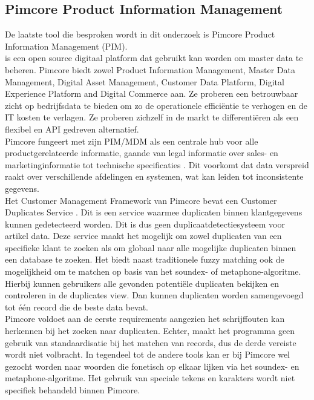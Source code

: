 \subsection{Pimcore Product Information Management}
De laatste tool die besproken wordt in dit onderzoek is Pimcore Product Information Management (PIM). 
\\ \textcite{Pimcore} is een open source digitaal platform dat gebruikt kan worden om master data te beheren. Pimcore biedt zowel Product Information Management, Master Data Management, Digital Asset Management, Customer Data Platform, Digital Experience Platform and Digital Commerce aan. Ze proberen een betrouwbaar zicht op bedrijfsdata te bieden om zo de operationele efficiëntie te verhogen en de IT kosten te verlagen. Ze proberen zichzelf in de markt te differentiëren als een flexibel en API gedreven alternatief. 
\\Pimcore fungeert met zijn PIM/MDM als een centrale hub voor alle productgerelateerde informatie, gaande van legal informatie over sales- en marketinginformatie tot technische specificaties \autocite{StudioEmma}. Dit voorkomt dat data verspreid raakt over verschillende afdelingen en systemen, wat kan leiden tot inconsistente gegevens.
\\Het Customer Management Framework van Pimcore bevat een Customer Duplicates Service \autocite{Pimcore2024}. Dit is een service waarmee duplicaten binnen klantgegevens kunnen gedetecteerd worden. Dit is dus geen duplicaatdetectiesysteem voor artikel data. Deze service maakt het mogelijk om zowel duplicaten van een specifieke klant te zoeken als om globaal naar alle mogelijke duplicaten binnen een database te zoeken. Het biedt naast traditionele fuzzy matching ook de mogelijkheid om te matchen op basis van het soundex- of metaphone-algoritme. Hierbij kunnen gebruikers alle gevonden potentiële duplicaten bekijken en controleren in de duplicates view. Dan kunnen duplicaten worden samengevoegd tot één record die de beste data bevat.
\\Pimcore voldoet aan de eerste requirements aangezien het schrijffouten kan herkennen bij het zoeken naar duplicaten. Echter, maakt het programma geen gebruik van standaardisatie bij het matchen van records, dus de derde vereiste wordt niet volbracht. In tegendeel tot de andere tools kan er bij Pimcore wel gezocht worden naar woorden die fonetisch op elkaar lijken via het soundex- en metaphone-algoritme. Het gebruik van speciale tekens en karakters wordt niet specifiek behandeld binnen Pimcore.
